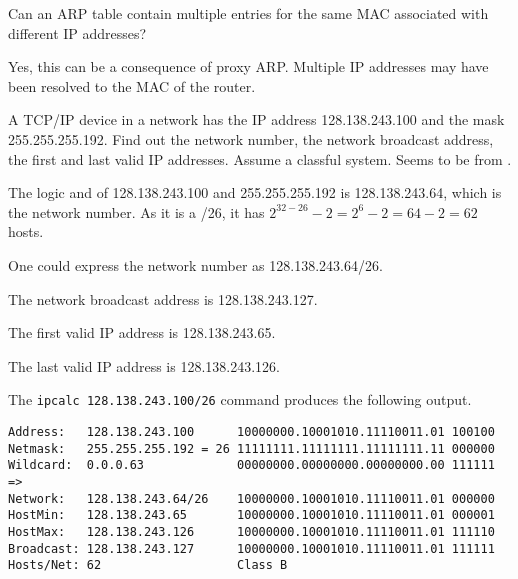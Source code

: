 \documentclass[12pt, oneside]{book}
\begin{document}
\begin{Exercise}
Can an ARP table contain multiple entries for the same MAC associated with different IP addresses?
\end{Exercise}
\begin{Answer}
Yes, this can be a consequence of proxy ARP.
Multiple IP addresses may have been resolved to the MAC of the router.
\end{Answer}

\begin{Exercise}
A TCP/IP device in a network has the IP address 128.138.243.100 and the mask 255.255.255.192.
Find out the network number, the network broadcast address, the first and last valid IP addresses.
Assume a classful system. Seems to be from \cite{unix-system-administration-handbook-nemeth-2000}.
\end{Exercise}
\begin{Answer}
The logic and of 128.138.243.100 and 255.255.255.192 is 128.138.243.64, which is the network number.
As it is a /26, it has \(2^{32-26} - 2 = 2^{6} - 2 = 64 - 2 = 62\) hosts.

One could express the network number as 128.138.243.64/26.

The network broadcast address is 128.138.243.127.

The first valid IP address is 128.138.243.65.

The last valid IP address is 128.138.243.126.

The \texttt{ipcalc 128.138.243.100/26} command produces the following output.

\small\begin{verbatim}
Address:   128.138.243.100      10000000.10001010.11110011.01 100100
Netmask:   255.255.255.192 = 26 11111111.11111111.11111111.11 000000
Wildcard:  0.0.0.63             00000000.00000000.00000000.00 111111
=>
Network:   128.138.243.64/26    10000000.10001010.11110011.01 000000
HostMin:   128.138.243.65       10000000.10001010.11110011.01 000001
HostMax:   128.138.243.126      10000000.10001010.11110011.01 111110
Broadcast: 128.138.243.127      10000000.10001010.11110011.01 111111
Hosts/Net: 62                   Class B
\end{verbatim}
\end{Answer}
\end{document}
